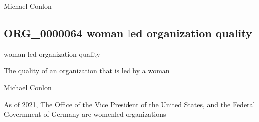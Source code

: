 \documentclass[letterpaper,10pt,english]{sphinxmanual}
\begin{document}
\begin{sphinxShadowBox}

\sphinxAtStartPar
Michael Conlon 
\end{sphinxShadowBox}
\begin{quote}

\ignorespaces \end{quote}


\subsection{ORG\_0000064 \sphinxhyphen{} woman led organization quality}
\label{\detokenize{doc-ORG_0000064:org-0000064-woman-led-organization-quality}}\label{\detokenize{doc-ORG_0000064:index-0}}\label{\detokenize{doc-ORG_0000064::doc}}
\begin{sphinxShadowBox}

\sphinxAtStartPar
woman led organization quality
\end{sphinxShadowBox}

\begin{sphinxShadowBox}

\sphinxAtStartPar
{\hyperref[\detokenize{doc-BFO_0000019::doc}]{}}
\end{sphinxShadowBox}

\begin{sphinxShadowBox}

\sphinxAtStartPar
The quality of an organization that is led by a woman
\end{sphinxShadowBox}

\begin{sphinxShadowBox}

\sphinxAtStartPar
Michael Conlon 
\end{sphinxShadowBox}

\begin{sphinxShadowBox}

\sphinxAtStartPar
As of 2021, The Office of the Vice President of the United States, and the Federal Government of Germany are women\sphinxhyphen{}led organizations
\end{sphinxShadowBox}
\end{document}
